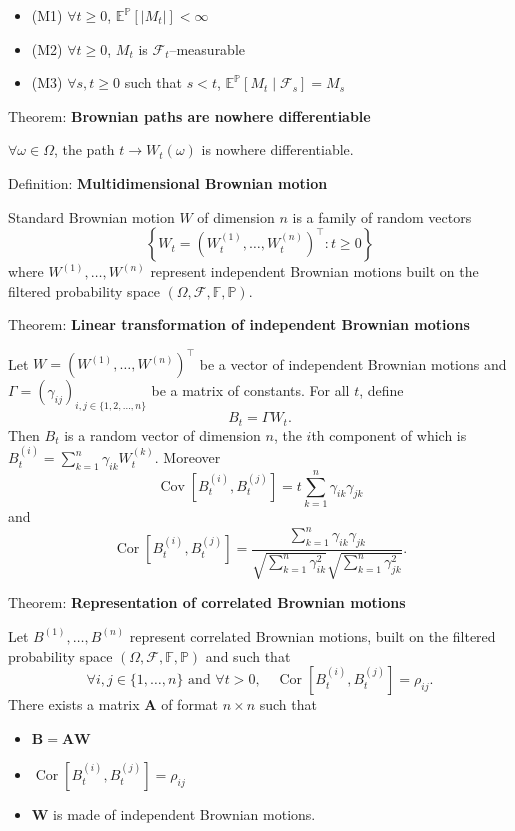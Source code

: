 \documentclass[12pt,a4paper]{article}
\begin{document}
\begin{itemize}
	\item (M1) $\forall t \geq 0$, $\mathbb{E}^{\mathbb{P}}[|M_t|] < \infty$
	\item (M2) $\forall t \geq 0$, $M_t$ is $\mathcal{F}_t$--measurable
	\item (M3) $\forall s, t \geq 0$ such that $s < t$, $\mathbb{E}^{\mathbb{P}}[M_t \mid \mathcal{F}_s] = M_s$
\end{itemize}
\vspace{1em}

Theorem: \textbf{Brownian paths are nowhere differentiable}
\vspace{0.5em}

$\forall \omega \in \Omega$, the path $t \to W_t(\omega)$ is nowhere differentiable.
\vspace{1em}

Definition: \textbf{Multidimensional Brownian motion}
\vspace{0.5em}

Standard Brownian motion $W$ of dimension $n$ is a family of random vectors
\[
\left\{ W_t = \left( W_t^{(1)}, \ldots, W_t^{(n)} \right)^{\top} : t \geq 0 \right\}
\]
where $W^{(1)}, \ldots, W^{(n)}$ represent independent Brownian motions built on the filtered probability space $(\Omega, \mathcal{F}, \mathbb{F}, \mathbb{P})$.
\vspace{1em}

Theorem: \textbf{Linear transformation of independent Brownian motions}
\vspace{0.5em}

Let $W = \left(W^{(1)}, \ldots, W^{(n)}\right)^{\top}$ be a vector of independent Brownian motions and $\Gamma = (\gamma_{ij})_{i,j \in \{1,2,\ldots,n\}}$ be a matrix of constants. For all $t$, define
\[
B_t = \Gamma W_t.
\]
Then $B_t$ is a random vector of dimension $n$, the $i$th component of which is $B_t^{(i)} = \sum_{k=1}^{n} \gamma_{ik} W_t^{(k)}$. Moreover
\[
\operatorname{Cov}\left[B_t^{(i)}, B_t^{(j)}\right] = t \sum_{k=1}^{n} \gamma_{ik}\gamma_{jk}
\]
and
\[
\operatorname{Cor}\left[B_t^{(i)}, B_t^{(j)}\right] = \frac{\sum_{k=1}^{n} \gamma_{ik}\gamma_{jk}}{\sqrt{\sum_{k=1}^{n} \gamma_{ik}^2} \sqrt{\sum_{k=1}^{n} \gamma_{jk}^2}}.
\]
\vspace{1em}

Theorem: \textbf{Representation of correlated Brownian motions}
\vspace{0.5em}

Let $B^{(1)}, \ldots, B^{(n)}$ represent correlated Brownian motions, built on the filtered probability space $(\Omega, \mathcal{F}, \mathbb{F}, \mathbb{P})$ and such that
\[
\forall i,j \in \{1, \ldots, n\} \text{ and } \forall t > 0, \quad \operatorname{Cor}\left[B_t^{(i)}, B_t^{(j)}\right] = \rho_{ij}.
\]
There exists a matrix $\mathbf{A}$ of format $n \times n$ such that
\begin{itemize}
	\item[(i)] $\mathbf{B} = \mathbf{A}\mathbf{W}$
	\item[(ii)] $\operatorname{Cor}\left[B_t^{(i)}, B_t^{(j)}\right] = \rho_{ij}$
	\item[(iii)] $\mathbf{W}$ is made of independent Brownian motions.
\end{itemize}
\end{document}
